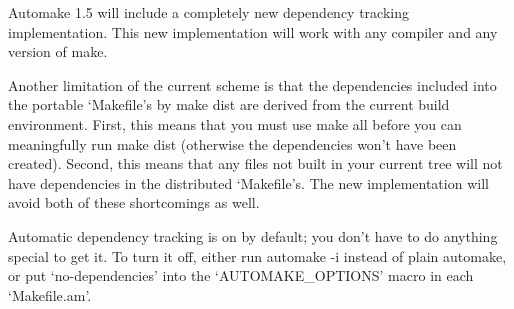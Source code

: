 Automake 1.5 will include a completely new dependency tracking implementation. This new implementation will work with any compiler and any version of make.

Another limitation of the current scheme is that the dependencies included into the portable `Makefile's by make dist are derived from the current build environment. First, this means that you must use make all before you can meaningfully run make dist (otherwise the dependencies won't have been created). Second, this means that any files not built in your current tree will not have dependencies in the distributed `Makefile's. The new implementation will avoid both of these shortcomings as well.

Automatic dependency tracking is on by default; you don't have to do anything special to get it. To turn it off, either run automake -i instead of plain automake, or put `no-dependencies' into the `AUTOMAKE\_{}OPTIONS' macro in each `Makefile.am'. 

